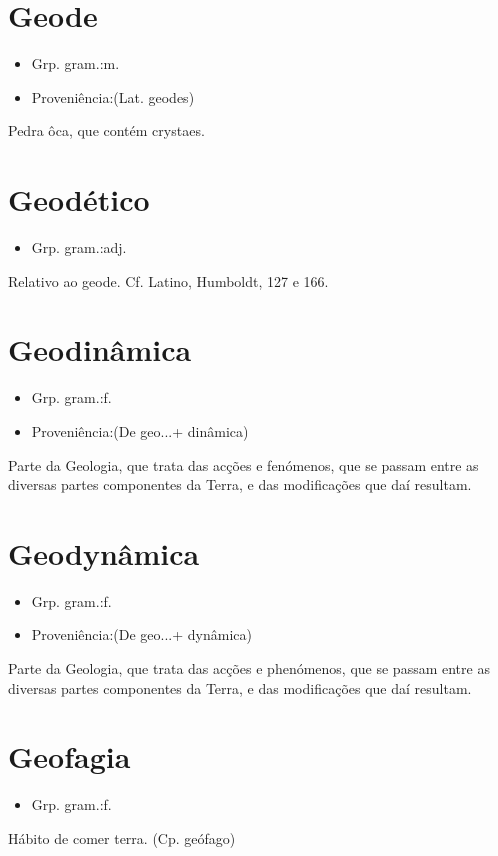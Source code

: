 \section{Geode}
\begin{itemize}
\item {Grp. gram.:m.}
\end{itemize}
\begin{itemize}
\item {Proveniência:(Lat. \textunderscore geodes\textunderscore )}
\end{itemize}
Pedra ôca, que contém crystaes.
\section{Geodético}
\begin{itemize}
\item {Grp. gram.:adj.}
\end{itemize}
Relativo ao geode. Cf. Latino, \textunderscore Humboldt\textunderscore , 127 e 166.
\section{Geodinâmica}
\begin{itemize}
\item {Grp. gram.:f.}
\end{itemize}
\begin{itemize}
\item {Proveniência:(De \textunderscore geo...\textunderscore  + \textunderscore dinâmica\textunderscore )}
\end{itemize}
Parte da Geologia, que trata das acções e fenómenos, que se passam entre as diversas partes componentes da Terra, e das modificações que daí resultam.
\section{Geodynâmica}
\begin{itemize}
\item {Grp. gram.:f.}
\end{itemize}
\begin{itemize}
\item {Proveniência:(De \textunderscore geo...\textunderscore  + \textunderscore dynâmica\textunderscore )}
\end{itemize}
Parte da Geologia, que trata das acções e phenómenos, que se passam entre as diversas partes componentes da Terra, e das modificações que daí resultam.
\section{Geofagia}
\begin{itemize}
\item {Grp. gram.:f.}
\end{itemize}
Hábito de comer terra.
(Cp. \textunderscore geófago\textunderscore )
